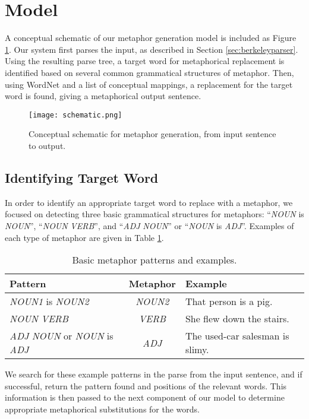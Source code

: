 \documentclass[12pt]{article}
\begin{document}
\section{Model}

A conceptual schematic of our metaphor generation model is included as Figure \ref{fig:schematic}.  Our system first parses the input, as described in Section \ref{sec:berkeleyparser}.  Using the resulting parse tree, a target word for metaphorical replacement is identified based on several common grammatical structures of metaphor.  Then, using WordNet and a list of conceptual mappings, a replacement for the target word is found, giving a metaphorical output sentence.

\begin{figure}[h]
	\centering
	\texttt{[image: schematic.png]}
	\caption{Conceptual schematic for metaphor generation, from input sentence to output.}
	\label{fig:schematic}
\end{figure}

\subsection{Identifying Target Word}
\label{sec:identtarget}
In order to identify an appropriate target word to replace with a metaphor, we focused on detecting three basic grammatical structures for metaphors: ``\emph{NOUN} is \emph{NOUN}'', ``\emph{NOUN} \emph{VERB}'', and ``\emph{ADJ} \emph{NOUN}'' or ``\emph{NOUN} is \emph{ADJ}''.  Examples of each type of metaphor are given in Table \ref{tab:metaphorexamples}.

\begin{table}[h]
	\centering
	\small
	\begin{tabular}{|l|c|l|} \hline
		\textbf{Pattern} & \textbf{Metaphor} & \textbf{Example}\\	\hline
		\emph{NOUN1} is \emph{NOUN2} & \emph{NOUN2} & That person is a pig.\\ \hline
		\emph{NOUN} \emph{VERB} & \emph{VERB} & She flew down the stairs.\\ \hline
		\emph{ADJ} \emph{NOUN} or \emph{NOUN} is \emph{ADJ} & \emph{ADJ} & The used-car salesman is slimy.\\ \hline
	\end{tabular}
	\caption{Basic metaphor patterns and examples.}
	\label{tab:metaphorexamples}
\end{table}

We search for these example patterns in the parse from the input sentence, and if successful, return the pattern found and positions of the relevant words.  This information is then passed to the next component of our model to determine appropriate metaphorical substitutions for the words.
\end{document}
